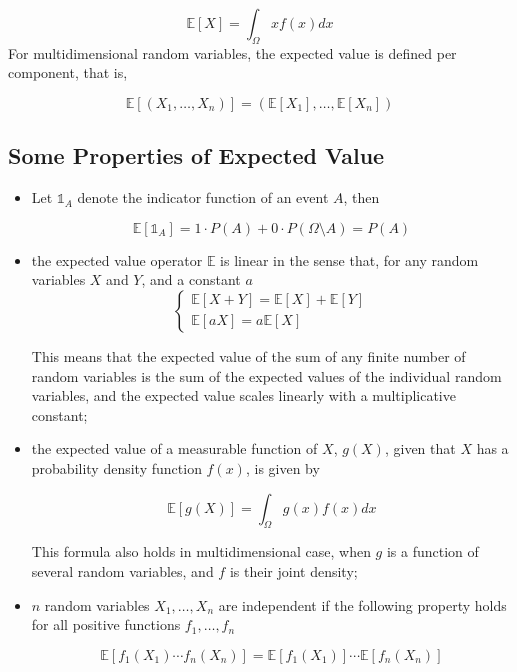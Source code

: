 \begin{equation}
\mathbb{E}[X]=\int_{\Omega}xf(x)dx
\end{equation}
For multidimensional random variables, the expected value is defined
per component, that is,

\begin{equation}
\mathbb{E}[(X_{1},\ldots ,X_{n})]=(\mathbb{E} [X_{1}],\ldots ,\mathbb{E}[X_{n}])
\end{equation}

\subsection{Some Properties of Expected Value}\label{some-properties}

\begin{itemize}
\tightlist
\item
Let \(\mathbb{1}_{A}\) denote the indicator function of an event
\(A\), then

\begin{equation}
	\mathbb{E}[\mathbb{1}_{A}] = 1\cdot P(A)+0\cdot P(\Omega \setminus A)= P(A)
\end{equation}

\item
the expected value operator \(\mathbb{E}\) is linear in the sense
that, for any random variables \(X\) and \(Y\), and a constant \(a\)
\begin{equation}
\begin{cases}
\mathbb{E}[X+Y] = \mathbb{E}[X] + \mathbb{E}[Y] \\
\mathbb{E}[aX] = a\mathbb{E}[X]
\end{cases}
\end{equation}

This means that the expected value of the sum of any finite number of
random variables is the sum of the expected values of the individual
random variables, and the expected value scales linearly with a
multiplicative constant;

\item
the expected value of a measurable function of \(X\), \(g(X)\), given
that \(X\) has a probability density function \(f(x)\), is given by

\begin{equation}
	\mathbb{E}[g(X)] = \int_{\Omega}g(x)f(x) dx
\end{equation}

This formula also holds in multidimensional case, when \(g\) is a
function of several random variables, and \(f\) is their joint density;

\item
\(n\) random variables \(X_1 ,\ldots , X_n\) are independent if the
following property holds for all positive functions
\(f_1 ,\ldots , f_n\)

\begin{equation}
	\mathbb{E}[f_1 (X_1 )\cdots f_n (X_n )] = \mathbb{E}[f_1 ( X_1 )] \cdots \mathbb{E}[f_n (X_n )]
\end{equation}
\end{itemize}


